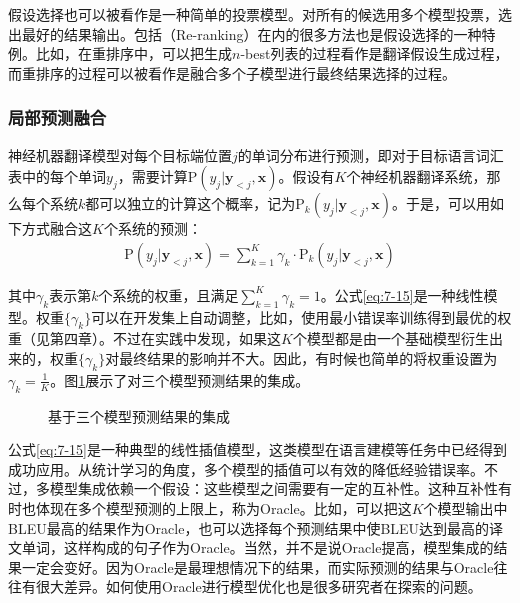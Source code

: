 \parinterval 假设选择也可以被看作是一种简单的投票模型。对所有的候选用多个模型投票，选出最好的结果输出。包括{\small{}}（Re-ranking）在内的很多方法也是假设选择的一种特例。比如，在重排序中，可以把生成$n$-best列表的过程看作是翻译假设生成过程，而重排序的过程可以被看作是融合多个子模型进行最终结果选择的过程。


\subsubsection{局部预测融合}

\parinterval 神经机器翻译模型对每个目标端位置$j$的单词分布进行预测，即对于目标语言词汇表中的每个单词$y_j$，需要计算$\textrm{P}(y_j | \mathbf{y}_{<j},\mathbf{x})$。假设有$K$个神经机器翻译系统，那么每个系统$k$都可以独立的计算这个概率，记为$\textrm{P}_{k} (y_j | \mathbf{y}_{<j},\mathbf{x})$。于是，可以用如下方式融合这$K$个系统的预测：
\begin{eqnarray}
\textrm{P}(y_{j} | \mathbf{y}_{<j} , \mathbf{x}) = \sum_{k=1}^K \gamma_{k} \cdot \textrm{P}_{k} (y_j | \mathbf{y}_{<j},\mathbf{x})
\label{eq:7-15}
\end{eqnarray}

\noindent 其中$\gamma_{k}$表示第$k$个系统的权重，且满足$\sum_{k=1}^{K} \gamma_{k} = 1$。公式\ref{eq:7-15}是一种线性模型。权重$\{ \gamma_{k}\}$可以在开发集上自动调整，比如，使用最小错误率训练得到最优的权重（见第四章）。不过在实践中发现，如果这$K$个模型都是由一个基础模型衍生出来的，权重$\{ \gamma_{k}\}$对最终结果的影响并不大。因此，有时候也简单的将权重设置为$\gamma_{k} = \frac{1}{K}$。图\ref{fig:7-25}展示了对三个模型预测结果的集成。

\begin{figure}[htp]
\centering

\caption{基于三个模型预测结果的集成}
\label{fig:7-25}
\end{figure}

\parinterval 公式\ref{eq:7-15}是一种典型的线性插值模型，这类模型在语言建模等任务中已经得到成功应用。从统计学习的角度，多个模型的插值可以有效的降低经验错误率。不过，多模型集成依赖一个假设：这些模型之间需要有一定的互补性。这种互补性有时也体现在多个模型预测的上限上，称为Oracle。比如，可以把这$K$个模型输出中BLEU最高的结果作为Oracle，也可以选择每个预测结果中使BLEU达到最高的译文单词，这样构成的句子作为Oracle。当然，并不是说Oracle提高，模型集成的结果一定会变好。因为Oracle是最理想情况下的结果，而实际预测的结果与Oracle往往有很大差异。如何使用Oracle进行模型优化也是很多研究者在探索的问题。


